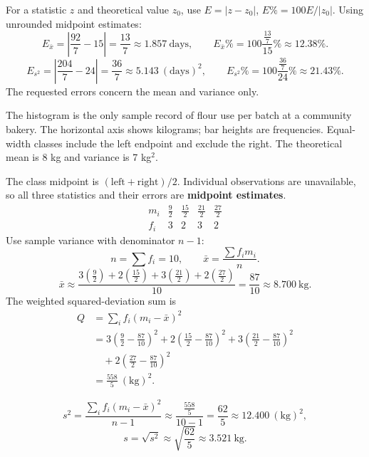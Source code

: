 For a statistic $z$ and theoretical value $z_0$, use $E=|z-z_0|$, $E\%=100E/|z_0|$.
Using unrounded midpoint estimates:
\[E_{\bar x}=\left|\frac{92}{7}-15\right|=\frac{13}{7}\approx1.857\ \mathrm{days},\qquad E_{\bar x}\%=100\frac{\frac{13}{7}}{15}\%\approx12.38\%.\]
\[E_{s^2}=\left|\frac{204}{7}-24\right|=\frac{36}{7}\approx5.143\ (\mathrm{days})^2,\qquad E_{s^2}\%=100\frac{\frac{36}{7}}{24}\%\approx21.43\%.\]
The requested errors concern the mean and variance only.

The histogram is the only sample record of flour use per batch at a community bakery. The horizontal axis shows kilograms; bar heights are frequencies. Equal-width classes include the left endpoint and exclude the right. The theoretical mean is 8 kg and variance is 7 kg$^2$.


\Needspace{16cm}

The class midpoint is $(\text{left}+\text{right})/2$. Individual observations are unavailable, so all three statistics and their errors are \textbf{midpoint estimates}.\[\begin{array}{c|rrrr}m_i&\frac{9}{2}&\frac{15}{2}&\frac{21}{2}&\frac{27}{2}\\\hline f_i&3&2&3&2\end{array}\]
Use sample variance with denominator $n-1$:
\[n=\sum f_i=10,\qquad\bar x=\frac{\sum f_im_i}{n}.\]
\[\bar x\approx\frac{3(\frac{9}{2})+2(\frac{15}{2})+3(\frac{21}{2})+2(\frac{27}{2})}{10}=\frac{87}{10}\approx8.700\ \mathrm{kg}.\]
The weighted squared-deviation sum is
\[\begin{aligned}Q&=\sum_i f_i(m_i-\bar x)^2\\&=3\left(\frac{9}{2}-\frac{87}{10}\right)^2+2\left(\frac{15}{2}-\frac{87}{10}\right)^2+3\left(\frac{21}{2}-\frac{87}{10}\right)^2\\&\quad+2\left(\frac{27}{2}-\frac{87}{10}\right)^2\\&=\frac{558}{5}\ (\mathrm{kg})^2.\end{aligned}\]
\begin{samepage}
\[s^2=\frac{\sum_i f_i(m_i-\bar x)^2}{n-1}\approx\frac{\frac{558}{5}}{10-1}=\frac{62}{5}\approx12.400\ (\mathrm{kg})^2,\]
\[s=\sqrt{s^2}\approx\sqrt{\frac{62}{5}}\approx3.521\ \mathrm{kg}.\]
\end{samepage}

